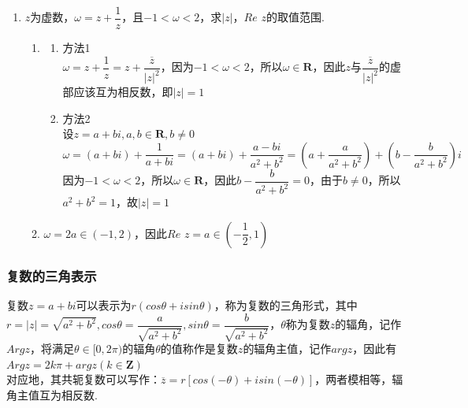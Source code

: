 \begin{enumerate}
\begin{jieda}
\begin{dingautolist}{172}
        \end{dingautolist}
    \end{jieda}
    \item $z$为虚数，$\omega = z + \dfrac{1}{z}$，且$-1 < \omega < 2$，求$|z|$，$Re$ $z$的取值范围.
    \begin{jieda}
        \begin{enumerate}
            \item
            \begin{enumerate}
                \item 方法1 \\
                $\omega = z + \dfrac{1}{z} = z + \dfrac{\overline{z}}{|z|^2}$，因为$-1 < \omega < 2$，所以$\omega \in \mathbf{R}$，因此$z$与$\dfrac{\overline{z}}{|z|^2}$的虚部应该互为相反数，即$|z| = 1$
                \item 方法2 \\
                设$z = a+bi, a,b \in \mathbf{R}, b \neq 0$ \\
                $\omega = (a+bi) + \dfrac{1}{a+bi} = (a+bi) + \dfrac{a-bi}{a^2+b^2} = \left(a+\dfrac{a}{a^2+b^2}\right) + \left(b - \dfrac{b}{a^2+b^2}\right)i$ \\
                因为$-1 < \omega < 2$，所以$\omega \in \mathbf{R}$，因此$b - \dfrac{b}{a^2+b^2} = 0$，由于$b \neq 0$，所以$a^2+b^2 = 1$，故$|z| = 1$
            \end{enumerate}
            
            \item $\omega = 2a \in (-1, 2)$，因此$Re$ $z = a \in \left(-\dfrac{1}{2}, 1\right)$
        \end{enumerate}
    \end{jieda}
\end{enumerate}

\subsubsection*{复数的三角表示}
复数$z = a + bi$可以表示为$r(cos\theta + isin\theta)$，称为复数的三角形式，其中$r  = |z| = \sqrt{a^2+b^2}, cos\theta = \dfrac{a}{\sqrt{a^2+b^2}}, sin\theta = \dfrac{b}{\sqrt{a^2+b^2}}$，$\theta$称为复数$z$的辐角，记作$Arg z$，将满足$\theta \in [0, 2\pi)$的辐角$\theta$的值称作是复数$z$的辐角主值，记作$arg z$，因此有$Arg z = 2k\pi + arg z (k \in \mathbf{Z})$ \\
对应地，其共轭复数可以写作：$\overline{z} = r[cos(-\theta) + isin(-\theta)]$，两者模相等，辐角主值互为相反数.

